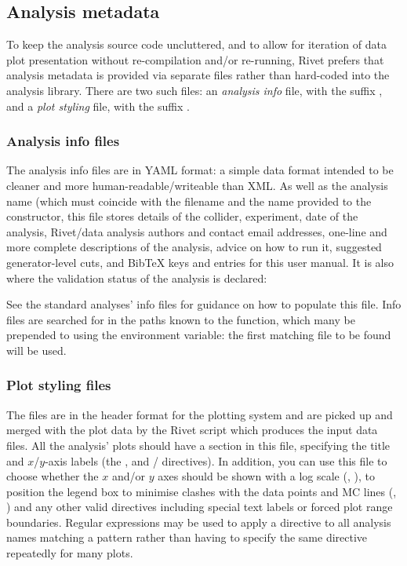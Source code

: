 \subsection{Analysis metadata}

To keep the analysis source code uncluttered, and to allow for iteration of data
plot presentation without re-compilation and/or re-running, Rivet prefers that
analysis metadata is provided via separate files rather than hard-coded into the
analysis library. There are two such files: an \emph{analysis info} file, with
the suffix , and a \emph{plot styling} file, with the suffix
.

\subsubsection{Analysis info files}

The analysis info files are in YAML format: a simple data format intended to be
cleaner and more human-readable/writeable than XML. As well as the analysis name
(which must coincide with the filename and the name provided to the
 constructor, this file stores details of the collider,
experiment, date of the analysis, Rivet/data analysis authors and contact email
addresses, one-line and more complete descriptions of the analysis, advice on
how to run it, suggested generator-level cuts, and BibTeX keys and entries for
this user manual. It is also where the validation status of the analysis is declared:

See the standard analyses' info files for guidance on how to populate this
file. Info files are searched for in the paths known to the
 function, which many be prepended to using
the  environment variable: the first matching file to be
found will be used.


\subsubsection{Plot styling files}

The  files are in the header format for the  plotting
system and are picked up and merged with the plot data by the Rivet
 script which produces the  input data
files. All the analysis' plots should have a 
section in this file, specifying the title and $x$/$y$-axis labels (the
, and / directives). In addition, you can use
this file to choose whether the $x$ and/or $y$ axes should be shown with a log
scale (, ), to position the legend box to minimise clashes
with the data points and MC lines (, ) and any
other valid  directives including special text labels or forced
plot range boundaries. Regular expressions may be used to apply a directive to
all analysis names matching a pattern rather than having to specify the same
directive repeatedly for many plots.

